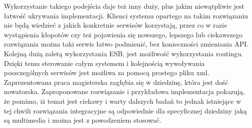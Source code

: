 Wykorzystanie takiego podejścia daje też inny duży, plus jakim niewątpliwie jest łatwość ukrywania implementacji. Klienci systemu opartego na takim rozwiązaniu nie będą wiedzieć z jakich konkretnie serwisów korzystają, przez co w razie wystąpienia kłopotów czy też pojawienia się nowszego, lepszego lub ciekawszego rozwiązania można taki serwis łatwo podmienić, bez konieczności zmieniania API. Kolejną dużą zaletą wykorzystania ESB, jest możliwość wykorzystania routingu. Dzięki temu sterowanie całym systemem i kolejnością wywoływania poszczególnych serwisów jest możliwa za pomocą prostego pliku xml.  \\
Zaprezentowana praca magisterska zagłębia się w dziedzinę, która jest dość nowatorska. Zaproponowane rozwiązanie i przykładowa implementacja pokazują, że pomimo, iż temat jest ciekawy i warty dalszych badań to jednak istniejące w tej chwili rozwiązania integracyjne są odpowiednie dla specyficznej dziedziny jaką są multimedia i można jest z powodzeniem stosować. 







